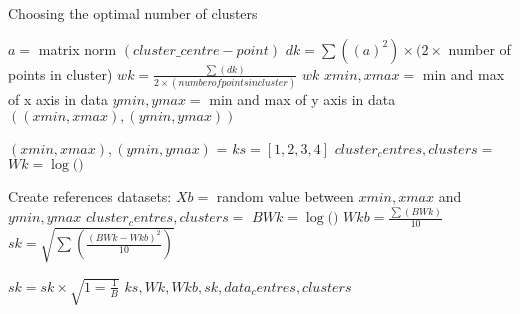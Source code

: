 \begin{algorithm}
\label{alg:GapStatistic}
\caption{Choosing the optimal number of clusters}
 \begin{algorithmic}[1]
    \Statex
    
    			\State $a = $ matrix norm $(cluster\_centre - point)$    			
    		\EndFor
    		\State $dk = \sum((a)^2 )\times (2 \times $ number of points in cluster)
    	\EndFor
    	\State $wk = \frac{ \sum(dk)}{2 \times (number of points in cluster)} $
    	\State \Return $wk$
    \EndFunction
    \Statex  
    	\State $xmin, xmax = $ min and max of x axis in data
    	\State $ymin, ymax = $ min and max of y axis in data
    	\State \Return $((xmin, xmax), (ymin, ymax)) $
    \EndFunction
    
    \Statex
    	\State $(xmin, xmax), (ymin, ymax)$ = 
    	 	\State $ks = [1,2,3,4]$
   			\State $cluster_centres, clusters = $ 
   			\State $Wk = \log($$)$
   			
   			\State Create references datasets:
   					\State $Xb = $ random value between $xmin, xmax$ and $ymin, ymax$
   				\EndFor
				\State $cluster_centres, clusters = $ 
  				\State $BWk = \log($$)$
   			\EndFor   
   			\State $Wkb = \frac{\sum(BWk)}{10} $	
   			\State $sk = \sqrt{\sum(\frac{(BWk - Wkb)^2}{10})}$	
   				
    	\EndFor
    	\State $sk = sk \times \sqrt{1=\frac{1}{B}}$
    	\State \Return $ks, Wk, Wkb, sk, data_centres, clusters$
    \EndFunction



  \end{algorithmic}
\end{algorithm}


